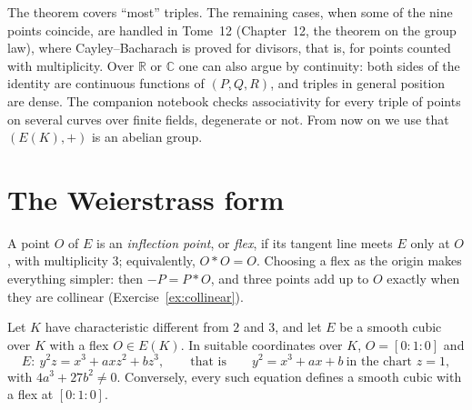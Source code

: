 \begin{remark}
The theorem covers ``most'' triples. The remaining cases, when some of the nine points coincide, are handled in Tome~12 (Chapter~12, the theorem on the
group law), where Cayley--Bacharach is proved for divisors, that is, for points counted with multiplicity. Over $\mathbb R$ or $\mathbb C$ one can also
argue by continuity: both sides of the identity are continuous functions of $(P,Q,R)$, and triples in general position are dense. The companion notebook
checks associativity for every triple of points on several curves over finite fields, degenerate or not. From now on we use that $(E(K),+)$ is an abelian
group.
\end{remark}

\section{The Weierstrass form}\label{sec:weierstrass}

A point $O$ of $E$ is an \emph{inflection point}, or \emph{flex}, if its tangent line meets $E$ only at $O$, with multiplicity $3$; equivalently, $O*O=O$.
Choosing a flex as the origin makes everything simpler: then $-P=P*O$, and three points add up to $O$ exactly when they are collinear (Exercise~\ref{ex:collinear}).

\begin{proposition}\label{prop:weierstrass}
Let $K$ have characteristic different from $2$ and $3$, and let $E$ be a smooth cubic over $K$ with a flex $O\in E(K)$. In suitable coordinates over
$K$, $O=[0:1:0]$ and
\[
E:\ y^2z=x^3+axz^2+bz^3,\qquad\text{that is}\qquad y^2=x^3+ax+b\ \text{in the chart }z=1,
\]
with $4a^3+27b^2\ne0$. Conversely, every such equation defines a smooth cubic with a flex at $[0:1:0]$.
\end{proposition}

